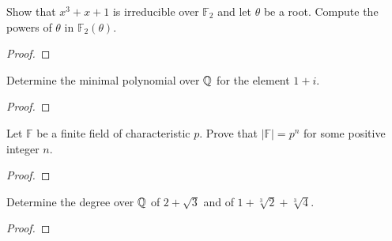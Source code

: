 \documentclass[num=6,duedate=03-17-21,course=Algebra\ II,proflastname=Walton]{hwtemplate}
\begin{document}

% 

\maketitle
\pagebreak
\problem[1]
\begin{claim}
	Show that \(x^3+x+1\) is irreducible over \(\mathbb{F}_2\) and let \(\theta \) be a root. Compute the powers of \(\theta \) in \(\mathbb{F}_2(\theta )\).
\end{claim}

\begin{proof}

\end{proof}

\problem[2]
\begin{claim}
	Determine the minimal polynomial over \(\mathbb{Q}\) for the element \(1+i\).
\end{claim}
\begin{proof}
	
\end{proof}

\problem[3]
\begin{claim}
	Let \(\mathbb{F}\) be a finite field of characteristic \(p\). Prove that \(\left| \mathbb{F} \right| =p^{n}\) for some positive integer \(n\).
\end{claim}
\begin{proof}
	
\end{proof}

\problem[4]
\begin{claim}
	Determine the degree over \(\mathbb{Q}\) of \(2+\sqrt{3} \) and of \(1+\sqrt[3]{2} + \sqrt[3]{4} \).
\end{claim}
\begin{proof}
	
\end{proof}
\end{document}
